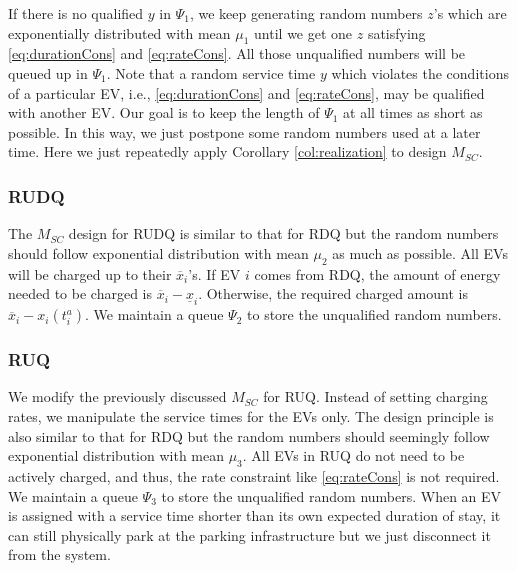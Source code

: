 \documentclass[journal]{IEEEtran}
\begin{document}
If there is no qualified $y$ in $\Psi_1$,  we keep generating random numbers $z$'s which are exponentially distributed with mean $\mu_1$ until we get one $z$ satisfying \eqref{eq:durationCons} and \eqref{eq:rateCons}. All those unqualified numbers will be queued up in $\Psi_1$.
Note that a random service time $y$ which violates the conditions of a particular EV, i.e., \eqref{eq:durationCons} and \eqref{eq:rateCons}, may be qualified with another EV.  Our goal is to keep the length of $\Psi_1$ at all times as short as possible. In this way, we just postpone some random numbers used at a later time. Here we just repeatedly apply Corollary \ref{col:realization} to design $M_{SC}$. 



\subsubsection{RUDQ}
The $M_{SC}$ design for RUDQ is similar to that for RDQ but the random numbers should follow exponential distribution with mean $\mu_2$ as much as possible. All EVs will be charged up to their $\overline{x}_i$'s. If EV $i$ comes from RDQ,  the amount of energy needed to be charged is $\overline{x}_i - \underline{x}_i$. Otherwise, the required charged amount is $\overline{x}_i - x_i(t_i^a)$.  We maintain a queue $\Psi_2$ to store the unqualified random numbers.

\subsubsection{RUQ}
We modify the previously discussed $M_{SC}$ for RUQ. Instead of setting charging rates, we manipulate the service times for the EVs only. The design principle  is also similar to that for RDQ but the random numbers should seemingly follow exponential distribution with mean $\mu_3$. All EVs in RUQ do not need to be actively charged, and thus, the rate constraint like \eqref{eq:rateCons} is not required. We maintain a queue $\Psi_3$ to store the unqualified random numbers. 
When an EV is assigned with a service time shorter than its own expected duration of stay, it can still physically park at the parking infrastructure but we just disconnect it from the system. 
\end{document}
